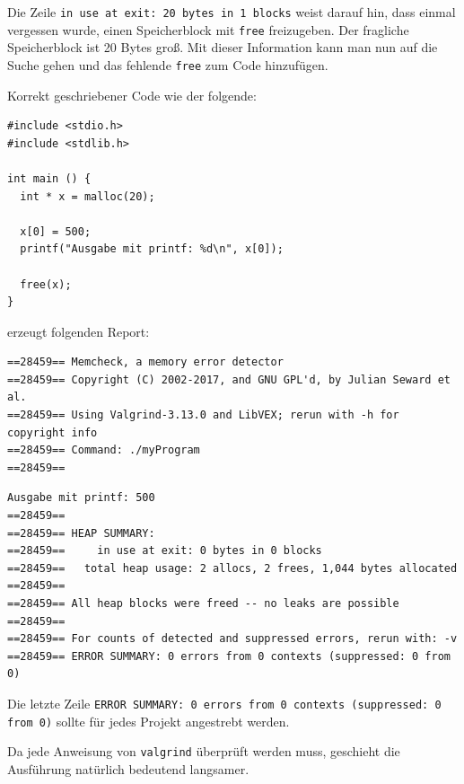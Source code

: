 Die Zeile \texttt{in use at exit: 20 bytes in 1 blocks} weist darauf hin, dass einmal vergessen wurde, einen Speicherblock mit \texttt{free} freizugeben. Der fragliche Speicherblock ist 20 Bytes groß. Mit dieser Information kann man nun auf die Suche gehen und das fehlende \texttt{free} zum Code hinzufügen.

Korrekt geschriebener Code wie der folgende:

\begin{codebox}
\begin{verbatim}
#include <stdio.h>
#include <stdlib.h>

int main () {
  int * x = malloc(20); 

  x[0] = 500;
  printf("Ausgabe mit printf: %d\n", x[0]); 
  
  free(x);
}
\end{verbatim}
\end{codebox}

erzeugt folgenden Report:

\begin{cmdbox}
\begin{verbatim}
==28459== Memcheck, a memory error detector
==28459== Copyright (C) 2002-2017, and GNU GPL'd, by Julian Seward et al.
==28459== Using Valgrind-3.13.0 and LibVEX; rerun with -h for copyright info
==28459== Command: ./myProgram
==28459== 
\end{verbatim}
\end{cmdbox}

\begin{cmdbox}[]
\begin{verbatim}
Ausgabe mit printf: 500
==28459== 
==28459== HEAP SUMMARY:
==28459==     in use at exit: 0 bytes in 0 blocks
==28459==   total heap usage: 2 allocs, 2 frees, 1,044 bytes allocated
==28459== 
==28459== All heap blocks were freed -- no leaks are possible
==28459== 
==28459== For counts of detected and suppressed errors, rerun with: -v
==28459== ERROR SUMMARY: 0 errors from 0 contexts (suppressed: 0 from 0)
\end{verbatim}
\end{cmdbox}

Die letzte Zeile \texttt{ERROR SUMMARY: 0 errors from 0 contexts (suppressed: 0 from 0)} sollte für jedes Projekt angestrebt werden.

Da jede Anweisung von \texttt{valgrind} überprüft werden muss, geschieht die Ausführung natürlich bedeutend langsamer.

